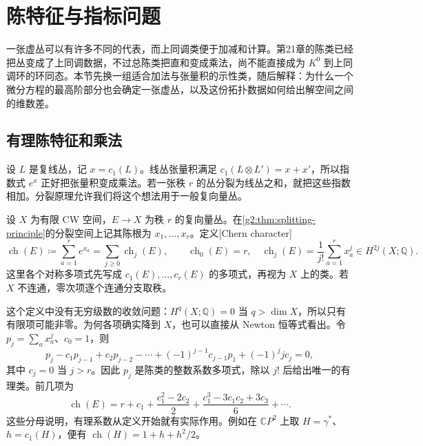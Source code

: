
% 
% 
% 

\section{陈特征与指标问题}
\label{g2:sec:2404}

一张虚丛可以有许多不同的代表，而上同调类便于加减和计算。第21章的陈类已经把丛变成了上同调数据，不过总陈类把直和变成乘法，尚不能直接成为 \(K^0\) 到上同调环的环同态。本节先换一组适合加法与张量积的示性类，随后解释：为什么一个微分方程的最高阶部分也会确定一张虚丛，以及这份拓扑数据如何给出解空间之间的维数差。

\subsection{有理陈特征和乘法}
\label{g2:subsec:2404:01}
设 \(L\) 是复线丛，记 \(x=c_1(L)\)。线丛张量积满足 \(c_1(L\otimes L')=x+x'\)，所以指数式 \(e^x\) 正好把张量积变成乘法。若一张秩 \(r\) 的丛分裂为线丛之和，就把这些指数相加。分裂原理允许我们将这个想法用于一般复向量丛。

\begin{definition}\label{g2:def:chern-character}
	设 \(X\) 为有限 CW 空间，\(E\to X\) 为秩 \(r\) 的复向量丛。在\cref{g2:thm:splitting-principle}的分裂空间上记其陈根为 \(x_1,\ldots,x_r\)。定义[Chern character]
	\[
		\operatorname{ch}(E)\coloneqq\sum_{a=1}^r e^{x_a}
		=\sum_{j\ge0}\operatorname{ch}_j(E),\qquad
		\operatorname{ch}_0(E)=r,\quad
		\operatorname{ch}_j(E)=\frac1{j!}\sum_{a=1}^r x_a^j\in H^{2j}(X;\mathbb Q).
	\]
	这里各个对称多项式先写成 \(c_1(E),\ldots,c_r(E)\) 的多项式，再视为 \(X\) 上的类。若 \(X\) 不连通，零次项逐个连通分支取秩。
\end{definition}

这个定义中没有无穷级数的收敛问题：\(H^q(X;\mathbb Q)=0\) 当 \(q>\dim X\)，所以只有有限项可能非零。为何各项确实降到 \(X\)，也可以直接从 Newton 恒等式看出。令 \(p_j=\sum_a x_a^j\)、\(c_0=1\)，则
\[
	p_j-c_1p_{j-1}+c_2p_{j-2}-\cdots+(-1)^{j-1}c_{j-1}p_1+(-1)^j j c_j=0,
\]
其中 \(c_j=0\) 当 \(j>r\)。因此 \(p_j\) 是陈类的整数系数多项式，除以 \(j!\) 后给出唯一的有理类。前几项为
\begin{equation}\label{g2:eq:chern-character-low-terms}
	\operatorname{ch}(E)=r+c_1+\frac{c_1^2-2c_2}{2}
	+\frac{c_1^3-3c_1c_2+3c_3}{6}+\cdots.
\end{equation}
这些分母说明，有理系数从定义开始就有实际作用。例如在 \(\mathbb CP^2\) 上取 \(H=\gamma^*\)、\(h=c_1(H)\)，便有 \(\operatorname{ch}(H)=1+h+h^2/2\)。

